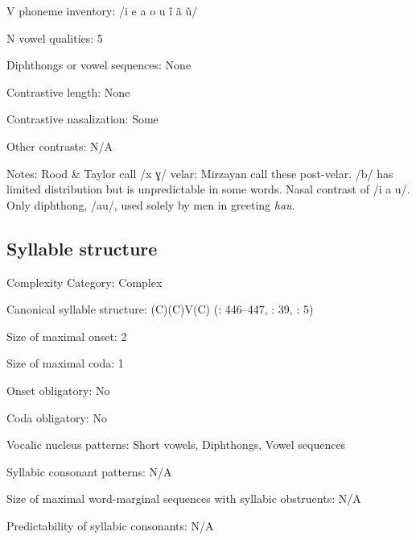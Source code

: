 {\begin{appendixdesc}
\item[V phoneme inventory:] /i e a o u ĩ ã ũ/

\item[N vowel qualities:] 5

\item[Diphthongs or vowel sequences:] None

\item[Contrastive length:] None

\item[Contrastive nasalization:] Some

\item[Other contrasts:] N/A

\item[Notes:] Rood \& Taylor call /x ɣ/ velar; Mirzayan call these post-velar. /b/ has limited distribution but is unpredictable in some words. Nasal contrast of /i a u/. Only diphthong, /au/, used solely by men in greeting \textit{hau}.
\end{appendixdesc}
\subsection*{Syllable structure}
\begin{appendixdesc}

\item[Complexity Category:] Complex

\item[Canonical syllable structure:] (C)(C)V(C) (\citealt{RoodTaylor1996}: 446--447, \citealt{Mirzayan2010}: 39, \citealt{Ingham2003}: 5)

\item[Size of maximal onset:] 2

\item[Size of maximal coda:] 1

\item[Onset obligatory:] No

\item[Coda obligatory:] No

\item[Vocalic nucleus patterns:] Short vowels, Diphthongs, Vowel sequences

\item[Syllabic consonant patterns:] N/A

\item[Size of maximal word-marginal sequences with syllabic obstruents:] N/A

\item[Predictability of syllabic consonants:] N/A


\end{appendixdesc}}
